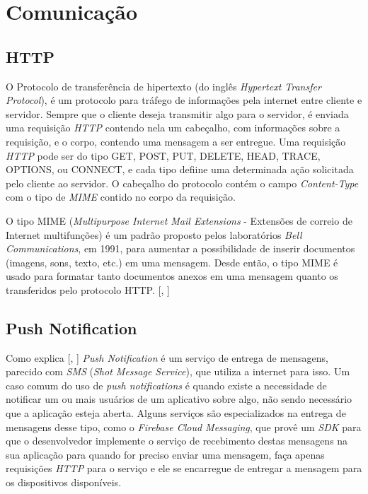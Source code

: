 \documentclass[
	12pt,				%
	oneside,			%
	a4paper,			%
	brazil				%
]{abntex2}
\newcommand{\citecustom}[1]{[\citeauthoronline{#1}, \citeyear{#1}]}
\begin{document}
\section{Comunicação}

\subsection{HTTP}

O Protocolo de transferência de hipertexto (do inglês \textit{Hypertext Transfer Protocol}), é um protocolo para tráfego de informações pela internet entre cliente e servidor. Sempre que o cliente deseja transmitir algo para o servidor, é enviada uma requisição \textit{HTTP} contendo nela um cabeçalho, com informações sobre a requisição, e o corpo, contendo uma mensagem a ser entregue. Uma requisição \textit{HTTP} pode ser do tipo GET, POST, PUT, DELETE, HEAD, TRACE, OPTIONS, ou CONNECT, e cada tipo defiine uma determinada ação solicitada pelo cliente ao servidor.
O cabeçalho do protocolo contém o campo \textit{Content-Type} com o tipo de \textit{MIME} contido no corpo da requisição. 

O tipo MIME (\textit{Multipurpose Internet Mail Extensions} - Extensões de correio de Internet multifunções) é um padrão proposto pelos laboratórios \textit{Bell Communications}, em 1991, para aumentar a possibilidade de inserir documentos (imagens, sons, texto, etc.) em uma mensagem. Desde então, o tipo MIME é usado para formatar tanto documentos anexos em uma mensagem quanto os transferidos pelo protocolo HTTP. \citecustom{CCM2017}

\subsection{Push Notification}

Como explica \citecustom{Finzi2016}
 \textit{Push Notification} é um serviço de entrega de mensagens, parecido com \textit{SMS} (\textit{Shot Message Service}), que utiliza a internet para isso. Um caso comum do uso de \textit{push notifications} é quando existe a necessidade de notificar um ou mais usuários de um aplicativo sobre algo, não sendo necessário que a aplicação esteja aberta. Alguns serviços são especializados na entrega de mensagens desse tipo, como o \textit{Firebase Cloud Messaging}, que provê um \textit{SDK} para que o desenvolvedor implemente o serviço de recebimento destas mensagens na sua aplicação para quando for preciso enviar uma mensagem, faça apenas requisições \textit{HTTP} para o serviço e ele se encarregue de entregar a mensagem para os dispositivos disponíveis.
\end{document}
